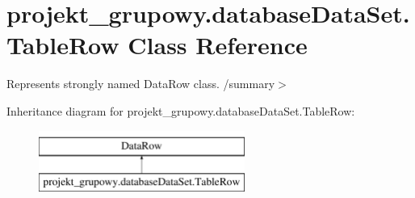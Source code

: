 \hypertarget{classprojekt__grupowy_1_1database_data_set_1_1_table_row}{}\section{projekt\+\_\+grupowy.\+database\+Data\+Set.\+Table\+Row Class Reference}
\label{classprojekt__grupowy_1_1database_data_set_1_1_table_row}


Represents strongly named Data\+Row class. /summary$>$  


Inheritance diagram for projekt\+\_\+grupowy.\+database\+Data\+Set.\+Table\+Row\+:\begin{figure}[H]
\begin{center}
\leavevmode
\includegraphics[height=2.000000cm]{classprojekt__grupowy_1_1database_data_set_1_1_table_row}
\end{center}
\end{figure}
